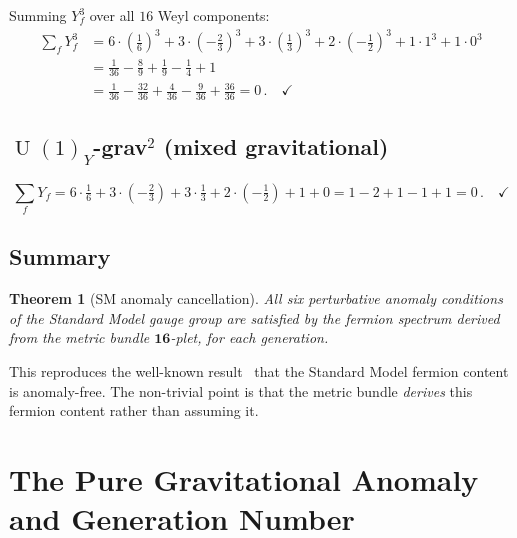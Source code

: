 \documentclass[12pt,a4paper]{article}
\newtheorem{theorem}{Theorem}[section]
\theoremstyle{definition}
\newcommand{\U}{\operatorname{U}}
\begin{document}
Summing $Y_f^3$ over all $16$ Weyl components:
\begin{align}
\sum_f Y_f^3 &= 6 \!\cdot\! \left(\tfrac{1}{6}\right)^{\!3} + 3 \!\cdot\! \left(-\tfrac{2}{3}\right)^{\!3} + 3 \!\cdot\! \left(\tfrac{1}{3}\right)^{\!3} + 2 \!\cdot\! \left(-\tfrac{1}{2}\right)^{\!3} + 1 \!\cdot\! 1^3 + 1 \!\cdot\! 0^3 \nonumber \\
&= \tfrac{1}{36} - \tfrac{8}{9} + \tfrac{1}{9} - \tfrac{1}{4} + 1 \nonumber \\
&= \tfrac{1}{36} - \tfrac{32}{36} + \tfrac{4}{36} - \tfrac{9}{36} + \tfrac{36}{36} = 0\,. \quad\checkmark
\end{align}

\subsection{\texorpdfstring{$\U(1)_Y$}{U(1)Y}-grav\texorpdfstring{$^2$}{²} (mixed gravitational)}

\begin{equation}
\sum_f Y_f = 6 \cdot \tfrac{1}{6} + 3 \cdot (-\tfrac{2}{3}) + 3 \cdot \tfrac{1}{3} + 2 \cdot (-\tfrac{1}{2}) + 1 + 0 = 1 - 2 + 1 - 1 + 1 = 0\,. \quad\checkmark
\end{equation}

\subsection{Summary}

\begin{theorem}[SM anomaly cancellation]
\label{thm:SM_anomaly_free}
All six perturbative anomaly conditions of the Standard Model gauge group are satisfied by the fermion spectrum derived from the metric bundle $\mathbf{16}$-plet, for each generation.
\end{theorem}

This reproduces the well-known result~\cite{BouchiatIliopoulosMeyer1972} that the Standard Model fermion content is anomaly-free.
The non-trivial point is that the metric bundle \emph{derives} this fermion content rather than assuming it.


\section{The Pure Gravitational Anomaly and Generation Number}
\label{sec:gravitational}
\end{document}
